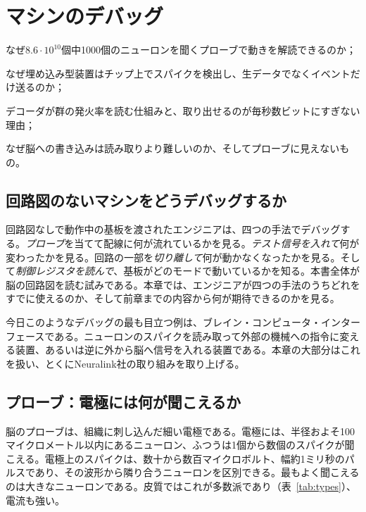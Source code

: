 \chapter{マシンのデバッグ}
\label{sec:debugging}
\begin{chaptergoals}
\item なぜ$8.6\cdot10^{10}$個中1000個のニューロンを聞くプローブで動きを解読できるのか；
\item なぜ埋め込み型装置はチップ上でスパイクを検出し、生データでなくイベントだけ送るのか；
\item デコーダが群の発火率を読む仕組みと、取り出せるのが毎秒数ビットにすぎない理由；
\item なぜ脳への書き込みは読み取りより難しいのか、そしてプローブに見えないもの。
\end{chaptergoals}

\section{回路図のないマシンをどうデバッグするか}

回路図なしで動作中の基板を渡されたエンジニアは、四つの手法でデバッグする。\emph{プローブ}を当てて配線に何が流れているかを見る。\emph{テスト信号を入れて}何が変わったかを見る。回路の一部を\emph{切り離して}何が動かなくなったかを見る。そして\emph{制御レジスタを読んで}、基板がどのモードで動いているかを知る。本書全体が脳の回路図を読む試みである。本章では、エンジニアが四つの手法のうちどれをすでに使えるのか、そして前章までの内容から何が期待できるのかを見る。

今日このようなデバッグの最も目立つ例は、ブレイン・コンピュータ・インターフェースである。ニューロンのスパイクを読み取って外部の機械への指令に変える装置、あるいは逆に外から脳へ信号を入れる装置である。本章の大部分はこれを扱い、とくにNeuralink社の取り組みを取り上げる。

\section{プローブ：電極には何が聞こえるか}

脳のプローブは、組織に刺し込んだ細い電極である。電極には、半径およそ100マイクロメートル以内にあるニューロン、ふつうは1個から数個のスパイクが聞こえる。電極上のスパイクは、数十から数百マイクロボルト、幅約1ミリ秒のパルスであり、その波形から隣り合うニューロンを区別できる。最もよく聞こえるのは大きなニューロンである。皮質ではこれが多数派であり（表~\ref{tab:types}）、電流も強い。

